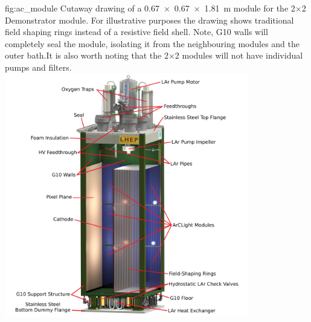 \begin{dunefigure}{fig:ac_module}
{Cutaway drawing of a \SI{0.67 x 0.67 x 1.81}{\metre}  module for the 2$\times$2 Demonstrator module. For illustrative purposes the drawing shows traditional field shaping rings instead of a resistive field shell. Note, G10 walls will completely seal the module, isolating it from the neighbouring modules and the outer  bath.It is also worth noting that the 2$\times$2 modules will not have individual pumps and filters.}
\includegraphics[width=0.8\textwidth]{graphics/Normal-Module-4K_labelled.jpeg}
\end{dunefigure}

